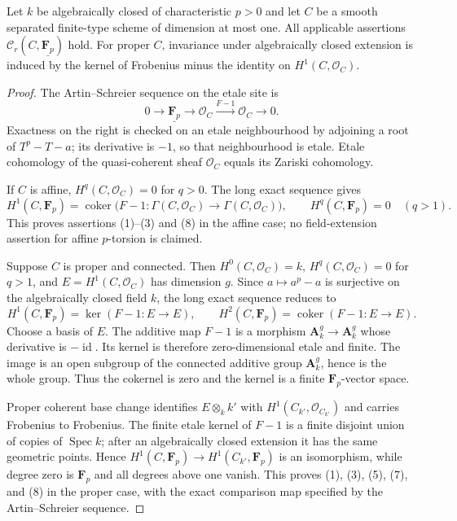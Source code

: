 \begin{lemma}
\label{lemma:weil-pbc-smooth-curve-artin-schreier}
Let $k$ be algebraically closed of characteristic $p>0$ and let $C$ be a
smooth separated finite-type scheme of dimension at most one.  All
applicable assertions $\mathcal C_r(C,\underline{\mathbf F_p})$ hold.
For proper $C$, invariance under algebraically closed extension is induced
by the kernel of Frobenius minus the identity on $H^1(C,\mathcal O_C)$.
\end{lemma}
\begin{proof}
The Artin--Schreier sequence on the etale site is
\[
 0\longrightarrow\underline{\mathbf F_p}\longrightarrow\mathcal O_C
 \xrightarrow{F-1}\mathcal O_C\longrightarrow0.
\]
Exactness on the right is checked on an etale neighbourhood by adjoining a
root of $T^p-T-a$; its derivative is $-1$, so that neighbourhood is etale.
Etale cohomology of the quasi-coherent sheaf $\mathcal O_C$ equals its
Zariski cohomology.

If $C$ is affine, $H^q(C,\mathcal O_C)=0$ for $q>0$.  The long exact
sequence gives
\[
 H^1(C,\mathbf F_p)=
 \operatorname{coker}\bigl(F-1:\Gamma(C,\mathcal O_C)\to
 \Gamma(C,\mathcal O_C)\bigr),\qquad
 H^q(C,\mathbf F_p)=0\quad(q>1).
\]
This proves assertions (1)--(3) and (8) in the affine case; no
field-extension assertion for affine $p$-torsion is claimed.

Suppose $C$ is proper and connected.  Then
$H^0(C,\mathcal O_C)=k$, $H^q(C,\mathcal O_C)=0$ for $q>1$, and
$E=H^1(C,\mathcal O_C)$ has dimension $g$.  Since $a\mapsto a^p-a$ is
surjective on the algebraically closed field $k$, the long exact sequence
reduces to
\[
 H^1(C,\mathbf F_p)=\ker(F-1:E\to E),\qquad
 H^2(C,\mathbf F_p)=\operatorname{coker}(F-1:E\to E).
\]
Choose a basis of $E$.  The additive map $F-1$ is a morphism
$\mathbf A_k^g\to\mathbf A_k^g$ whose derivative is $-\operatorname{id}$.
Its kernel is therefore zero-dimensional etale and finite.  The image is an
open subgroup of the connected additive group $\mathbf A_k^g$, hence is the
whole group.  Thus the cokernel is zero and the kernel is a finite
$\mathbf F_p$-vector space.

Proper coherent base change identifies
$E\otimes_kk'$ with $H^1(C_{k'},\mathcal O_{C_{k'}})$ and carries Frobenius
to Frobenius.  The finite etale kernel of $F-1$ is a finite disjoint union
of copies of $\operatorname{Spec}k$; after an algebraically closed extension
it has the same geometric points.  Hence
$H^1(C,\mathbf F_p)\to H^1(C_{k'},\mathbf F_p)$ is an isomorphism, while
degree zero is $\mathbf F_p$ and all degrees above one vanish.  This proves
(1), (3), (5), (7), and (8) in the proper case, with the exact comparison
map specified by the Artin--Schreier sequence.
\end{proof}

